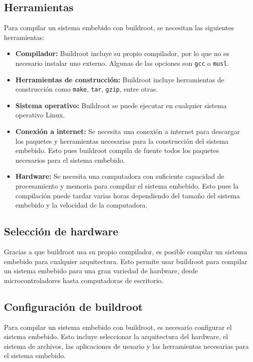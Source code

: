 \documentclass[12pt, letterpaper]{article}
\begin{document}
	\subsection{Herramientas}

	Para compilar un sistema embebido con buildroot, se necesitan las siguientes herramientas:

	\begin{itemize}
		\item \textbf{Compilador:} Buildroot incluye su propio compilador, por lo que no es necesario instalar uno externo. Algunas de las opciones son \texttt{gcc} o \texttt{musl}.
		\item \textbf{Herramientas de construcción:} Buildroot incluye herramientas de construcción como \texttt{make}, \texttt{tar}, \texttt{gzip}, entre otras.
		\item \textbf{Sistema operativo:} Buildroot se puede ejecutar en cualquier sistema operativo Linux.
		\item \textbf{Conexión a internet:} Se necesita una conexión a internet para descargar los paquetes y herramientas necesarias para la construcción del sistema embebido. Esto pues buildroot compila de fuente todos los paquetes necesarios para el sistema embebido.
		\item \textbf{Hardware:} Se necesita una computadora con suficiente capacidad de procesamiento y memoria para compilar el sistema embebido. Esto pues la compilación puede tardar varias horas dependiendo del tamaño del sistema embebido y la velocidad de la computadora.
	\end{itemize}

	\subsection{Selección de hardware}

	Gracias a que buildroot usa su propio compilador, es posible compilar un sistema embebido para cualquier arquitectura. Esto permite usar buildroot para compilar un sistema embebido para una gran variedad de hardware, desde microcontroladores hasta computadoras de escritorio.

	\subsection{Configuración de buildroot}

	Para compilar un sistema embebido con buildroot, es necesario configurar el sistema embebido. Esto incluye seleccionar la arquitectura del hardware, el sistema de archivos, las aplicaciones de usuario y las herramientas necesarias para el sistema embebido.
\end{document}
